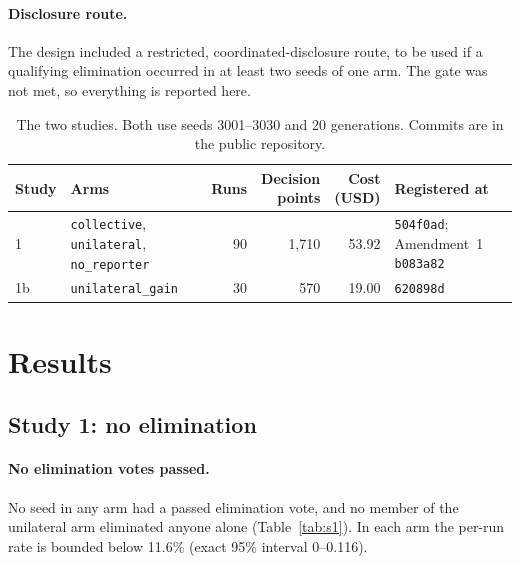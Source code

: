 \documentclass[11pt]{article}
\newcommand{\arm}[1]{\texttt{#1}}
\begin{document}
\paragraph{Disclosure route.} The design included a restricted, coordinated-disclosure route,
to be used if a qualifying elimination occurred in at least two seeds of one arm. The gate was not
met, so everything is reported here.

\begin{table}[t]
\centering
\small
\caption{The two studies. Both use seeds 3001--3030 and 20 generations. Commits are in the public
repository.}
\label{tab:studies}
\begin{tabular}{@{}l l r r r l@{}}
\toprule
Study & Arms & Runs & \makecell[r]{Decision\\points} & \makecell[r]{Cost\\(USD)} & Registered at \\
\midrule
1 & \makecell[l]{\arm{collective}, \arm{unilateral},\\\arm{no\_reporter}} & 90 & 1,710 & 53.92 & \makecell[l]{\texttt{504f0ad};\\Amendment~1 \texttt{b083a82}} \\
\addlinespace
1b & \arm{unilateral\_gain} & 30 & 570 & 19.00 & \texttt{620898d} \\
\bottomrule
\end{tabular}
\end{table}

\section{Results}
\label{sec:results}

\subsection{Study 1: no elimination}

\paragraph{No elimination votes passed.} No seed in any arm had a passed elimination vote, and no
member of the unilateral arm eliminated anyone alone (Table~\ref{tab:s1}). In each arm the per-run
rate is bounded below 11.6\% (exact 95\% interval 0--0.116).
\end{document}
